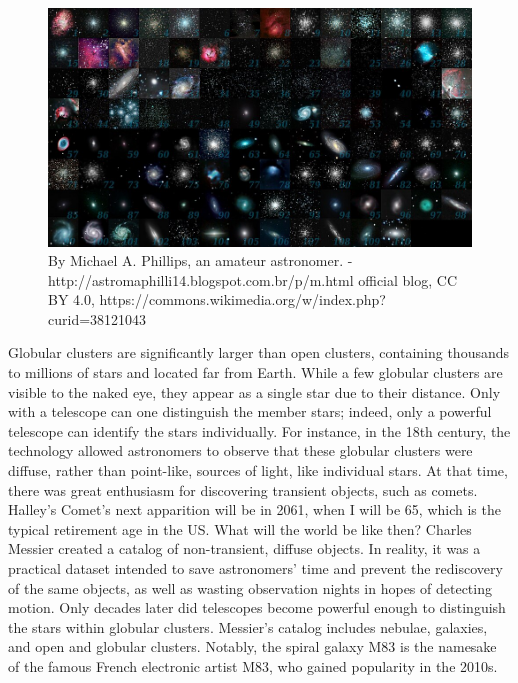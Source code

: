 \begin{figure}
    \centering
    \includegraphics[width=\linewidth]{images/All_messier_objects.jpg}
    \caption{By Michael A. Phillips, an amateur astronomer. - http://astromaphilli14.blogspot.com.br/p/m.html official blog, CC BY 4.0, https://commons.wikimedia.org/w/index.php?curid=38121043}
    \label{fig:All_messier_objects}
\end{figure}



Globular clusters are significantly larger than open clusters, containing thousands to millions of stars and located far from Earth. While a few globular clusters are visible to the naked eye, they appear as a single star due to their distance. Only with a telescope can one distinguish the member stars; indeed, only a powerful telescope can identify the stars individually. For instance, in the 18th century, the technology allowed astronomers to observe that these globular clusters were diffuse, rather than point-like, sources of light, like individual stars. At that time, there was great enthusiasm for discovering transient objects, such as comets. Halley's Comet's next apparition will be in 2061, when I will be 65, which is the typical retirement age in the US. What will the world be like then? Charles Messier created a catalog of non-transient, diffuse objects. In reality, it was a practical dataset intended to save astronomers' time and prevent the rediscovery of the same objects, as well as wasting observation nights in hopes of detecting motion. Only decades later did telescopes become powerful enough to distinguish the stars within globular clusters. Messier's catalog includes nebulae, galaxies, and open and globular clusters. Notably, the spiral galaxy M83 is the namesake of the famous French electronic artist M83, who gained popularity in the 2010s.

